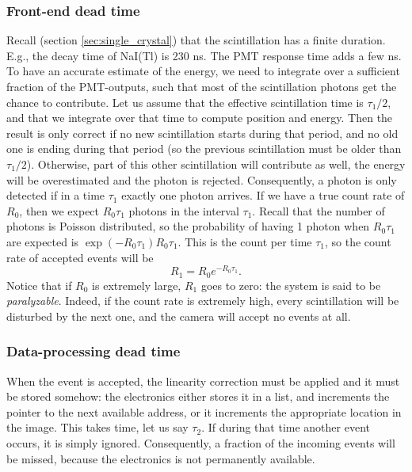 \subsubsection{Front-end dead time}
Recall (section \ref{sec:single_crystal}) that the scintillation has
a finite duration. E.g., the decay time of NaI(Tl) is 230 ns. The PMT
response time adds a few ns. To have an accurate estimate of the
energy, we need to integrate over a sufficient fraction of the
PMT-outputs, such that most of the scintillation photons get the
chance to contribute. Let us assume that the effective scintillation
time is $\tau_1 / 2$, and that we integrate over that time to compute
position and energy. Then the result is only correct if no new
scintillation starts during that period, and no old one is ending
during that period (so the previous scintillation must be older than
$\tau_1/2$).  Otherwise, part of this other scintillation will
contribute as well, the energy will be overestimated and the photon is
rejected. Consequently, a photon is only detected if in a time
$\tau_1$ exactly one photon arrives.  If we have a true count rate of
$R_0$, then we expect $R_0 \tau_1$ photons in the interval
$\tau_1$. Recall that the number of photons is Poisson distributed, so
the probability of having 1 photon when $R_0 \tau_1$ are expected is
$\exp(- R_0 \tau_1) R_0 \tau_1$. This is the count per time $\tau_1$,
so the count rate of accepted events will be
\begin{equation}
  R_1 = R_0 e^{-R_0 \tau_1}. \label{eq:deadtime_front}
\end{equation}
Notice that if $R_0$ is extremely large, $R_1$ goes to zero: the system is
said to be {\em paralyzable}. Indeed, if the count rate is extremely high,
every scintillation will be disturbed by the next one, and the camera will
accept no events at all.

\subsubsection{Data-processing dead time}
When the event is accepted, the linearity correction must be applied and it
must be stored somehow: the electronics either stores it in a list, and
increments the pointer to the next available address, or it increments the
appropriate location in the image. This takes time, let us say $\tau_2$. If
during that time another event occurs, it is simply ignored. Consequently, a
fraction of the incoming events will be missed, because the electronics is not
permanently available.

